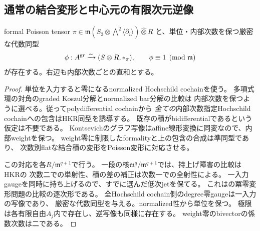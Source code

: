 \subsection{通常の結合変形と中心元の有限次元逆像}
\begin{lemma}[次数を保つunitalな星積模型]\label{cft:lem:model}
formal Poisson tensor
$\pi\in\mathfrak m(S_2\otimes\bigwedge^2\langle\partial_i\rangle)\widehat\otimes R$
と、単位・内部次数を保つ厳密な代数同型
\begin{equation}\label{cft:eq:phi}
 \phi:A^{\rm gr}\xrightarrow{\sim}(S\otimes R,*_\pi),\qquad
 \phi\equiv1\pmod{\mathfrak m}
\end{equation}
が存在する。右辺も内部次数ごとの直和とする。
\end{lemma}
\begin{proof}
単位を入力すると零になるnormalized Hochschild cochainを使う。
多項式環の対角のgraded Koszul分解とnormalized bar分解の比較は
内部次数を保つように選べる。従ってpolydifferential cochainから
\emph{全ての}内部次数指定Hochschild cochainへの包含はHKR同型を誘導する。
既存の積がbidifferentialであるという仮定は不要である。
Kontsevichのグラフ写像はaffine線形変換に同変なので、内部weightを保つ。
weight零に制限したformalityと上の包含の合成は準同型であり、
次数別flatな結合積の変形をPoisson変形に対応させる。

この対応を各$R/\mathfrak m^{q+1}$で行う。
一段の核$\mathfrak m^q/\mathfrak m^{q+1}$では、持上げ障害の比較はHKRの
次数二での単射性、積の差の補正は次数一での全射性による。
一入力gaugeを同時に持ち上げるので、すでに選んだ低次jetを保てる。
これは\cite[Theorem~4.6]{PKontsevich}の冪零変形問題の比較の逐次形である。
全Hochschild cochain側のdegree零gaugeは一入力の写像であり、
厳密な代数同型を与える。normalized性から単位を保つ。
極限は各有限自由$A_j$内で存在し、逆写像も同様に存在する。
weight零のbivectorの係数次数は二である。
\end{proof}

